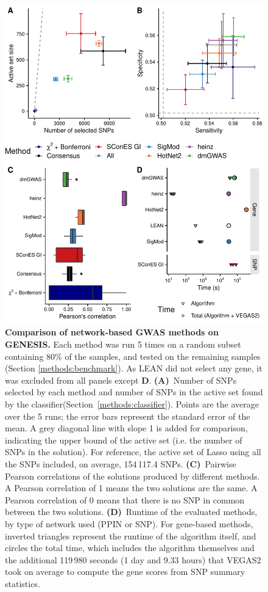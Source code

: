 \documentclass[10pt,letterpaper]{article}
\begin{document}
\begin{figure}[!ht]
  \centering
  \includegraphics[width=\linewidth]{./figures/figure_4.pdf}
  \caption{{ \bf Comparison of network-based GWAS methods on GENESIS. } Each method was run 5 times on a random subset containing 80\% of the samples, and tested on the remaining samples (Section \ref{methods:benchmark}). As LEAN did not select any gene, it was excluded from all panels except \textbf{D}. \textbf{(A)}~Number of SNPs selected by each method and number of SNPs in the active set found by the classifier(Section~\ref{methods:classifier}). Points are the average over the 5 runs; the error bars represent the standard error of the mean. A grey diagonal line with slope 1 is added for comparison, indicating the upper bound of the active set (i.e. the number of SNPs in the solution). For reference, the active set of Lasso using all the SNPs included, on average, 154\,117.4 SNPs. \textbf{(C)}~Pairwise Pearson correlations of the solutions produced by different methods. A Pearson correlation of 1 means the two solutions are the same. A Pearson correlation of 0 means that there is no SNP in common between the two solutions. \textbf{(D)}~Runtime of the evaluated methods, by type of network used (PPIN or SNP). For gene-based methods, inverted triangles represent the runtime of the algorithm itself, and circles the total time, which includes the algorithm themselves and the additional 119\,980 seconds (1 day and 9.33 hours) that VEGAS2 took on average to compute the gene scores from SNP summary statistics.}
  \label{fig:benchmark}
  \end{figure}
\end{document}
